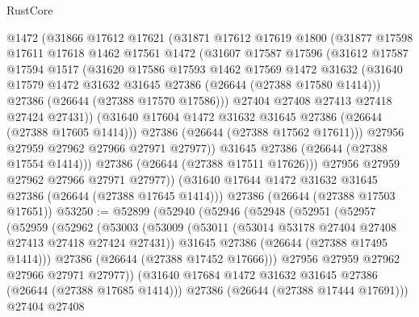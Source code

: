 \begin{lexlean}{RustCore}
\begin{coremodule}
            @1472
            (@31866
              @17612
              @17621
              (@31871
                @17612
                @17619
                @1800
                (@31877
                  @17598
                  @17611
                  @17618
                  @1462
                  @17561
                  @1472
                  (@31607
                    @17587
                    @17596
                    (@31612
                      @17587
                      @17594
                      @1517
                      (@31620
                        @17586
                        @17593
                        @1462
                        @17569
                        @1472
                        @31632
                        (@31640 @17579 @1472 @31632 @31645 @27386 (@26644 (@27388 @17580 @1414)))
                        @27386
                        (@26644 (@27388 @17570 @17586)))
                      @27404
                      @27408
                      @27413
                      @27418
                      @27424
                      @27431))
                  (@31640 @17604 @1472 @31632 @31645 @27386 (@26644 (@27388 @17605 @1414)))
                  @27386
                  (@26644 (@27388 @17562 @17611)))
                @27956
                @27959
                @27962
                @27966
                @27971
                @27977))
            @31645
            @27386
            (@26644 (@27388 @17554 @1414)))
          @27386
          (@26644 (@27388 @17511 @17626)))
        @27956
        @27959
        @27962
        @27966
        @27971
        @27977))
    (@31640 @17644 @1472 @31632 @31645 @27386 (@26644 (@27388 @17645 @1414)))
    @27386
    (@26644 (@27388 @17503 @17651))
@53250 := @52899
    (@52940
      (@52946
        (@52948
          (@52951
            (@52957
              (@52959
                (@52962
                  (@53003
                    (@53009
                      (@53011 (@53014 @53178 @27404 @27408 @27413 @27418 @27424 @27431))
                      @31645
                      @27386
                      (@26644 (@27388 @17495 @1414)))
                    @27386
                    (@26644 (@27388 @17452 @17666)))
                  @27956
                  @27959
                  @27962
                  @27966
                  @27971
                  @27977))
              (@31640 @17684 @1472 @31632 @31645 @27386 (@26644 (@27388 @17685 @1414)))
              @27386
              (@26644 (@27388 @17444 @17691)))
            @27404
            @27408

\end{coremodule}
\end{lexlean}
